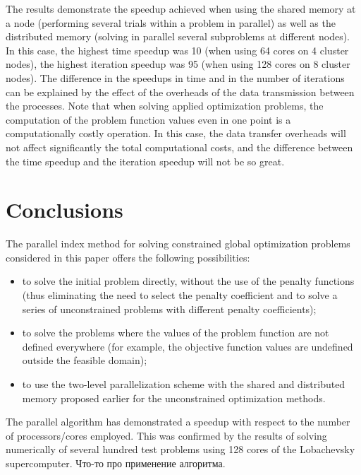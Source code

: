 \documentclass[smallextended]{svjour3}       %
\begin{document}
The results demonstrate the speedup achieved when using the shared memory at a node (performing several trials within a problem in parallel) as well as the distributed memory (solving in parallel several subproblems at different nodes). In this case, the highest time speedup was 10 (when using 64 cores on 4 cluster nodes), the highest iteration speedup was 95 (when using 128 cores on 8 cluster nodes). The difference in the speedups in time and in the number of iterations can be explained by the effect of the overheads of the data transmission between the processes. Note that when solving applied optimization problems, the computation of the problem function values even in one point is a computationally costly operation. In this case, the data transfer overheads will not affect significantly the total computational costs, and the difference between the time speedup and the iteration speedup will not be so great.


\section{Conclusions}
\label{sec:5}

The parallel index method for solving constrained global optimization problems considered in this paper offers the following possibilities:
\begin{itemize}
	\item to solve the initial problem directly, without the use of the penalty functions (thus eliminating the need to select the penalty coefficient and to solve a series of unconstrained problems with different penalty coefficients);
	\item to solve the problems where the values of the problem function are not defined everywhere (for example, the objective function values are undefined outside the feasible domain);
	\item to use the two-level parallelization scheme with the shared and distributed memory proposed earlier for the unconstrained optimization methods.
\end{itemize}

The parallel algorithm has demonstrated a speedup with respect to the number of processors/cores employed. This was confirmed by the results of solving numerically of several hundred test problems using 128 cores of the Lobachevsky supercomputer. 
\Russian
Что-то про применение алгоритма. 
\end{document}
